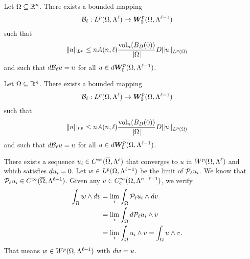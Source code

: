 \documentclass[10pt,a4paper]{article}
\begin{document}
 
 
 


























\begin{lemma}
    Let $\Omega \subseteq {\mathbb R}^{n}$. There exists a bounded mapping 
    \begin{align*}
     {\mathcal B}_{\ell} : L^{p}(\Omega,\Lambda^{\ell}) \rightarrow \bm{W}^{p}_{0}(\Omega,\Lambda^{\ell-1})
    \end{align*}
    such that 
    \begin{align*}
        \| u \|_{L^{p}} \leq n A(n,\ell) \frac{ \operatorname{vol}_{n}(B_D(0)) }{|\Omega|} D \| u \|_{L^{p}(\Omega)}
    \end{align*}
    and such that $d {\mathcal B}_{\ell} u = u$ for all $u \in d \bm{W}^{p}_{0}(\Omega,\Lambda^{\ell-1})$.
\end{lemma}

\begin{lemma}
    Let $\Omega \subseteq {\mathbb R}^{n}$. There exists a bounded mapping 
    \begin{align*}
     {\mathcal B}_{\ell} : L^{p}(\Omega,\Lambda^{\ell}) \rightarrow \bm{W}^{p}_{0}(\Omega,\Lambda^{\ell-1})
    \end{align*}
    such that 
    \begin{align*}
        \| u \|_{L^{p}} \leq n A(n,\ell) \frac{ \operatorname{vol}_{n}(B_D(0)) }{|\Omega|} D \| u \|_{L^{p}(\Omega)}
    \end{align*}
    and such that $d {\mathcal B}_{\ell} u = u$ for all $u \in d \bm{W}^{p}_{0}(\Omega,\Lambda^{\ell-1})$.
\end{lemma}





There exists a sequence $u_{i} \in C^{\infty}(\overline\Omega,\Lambda^{\ell})$ that converges to $u$ in $W^{p}(\Omega,\Lambda^{\ell})$
and which satisfies $d u_{i} = 0$. Let $w \in L^{p}(\Omega,\Lambda^{\ell-1})$ be the limit of ${\mathcal P}_{\ell} u_{i}$.
We know that ${\mathcal P}_{\ell} u_{i} \in C^{\infty}(\overline\Omega,\Lambda^{\ell-1})$. 
Given any $v \in C^{\infty}_{c}(\Omega,\Lambda^{n-\ell-1})$, we verify 
\begin{align*}
    \int_{\Omega} w \wedge d v
    &=
    \lim_{i} \int_{\Omega} {\mathcal P}_{\ell} u_{i} \wedge d v
    \\&=
    \lim_{i} \int_{\Omega} d {\mathcal P}_{\ell} u_{i} \wedge v
    \\&=
    \lim_{i} \int_{\Omega} u_{i} \wedge v
    =
    \int_{\Omega} u \wedge v
    .
\end{align*}
That means $w \in W^{p}(\Omega,\Lambda^{\ell-1})$ with $d w = u$. 
\end{document}
